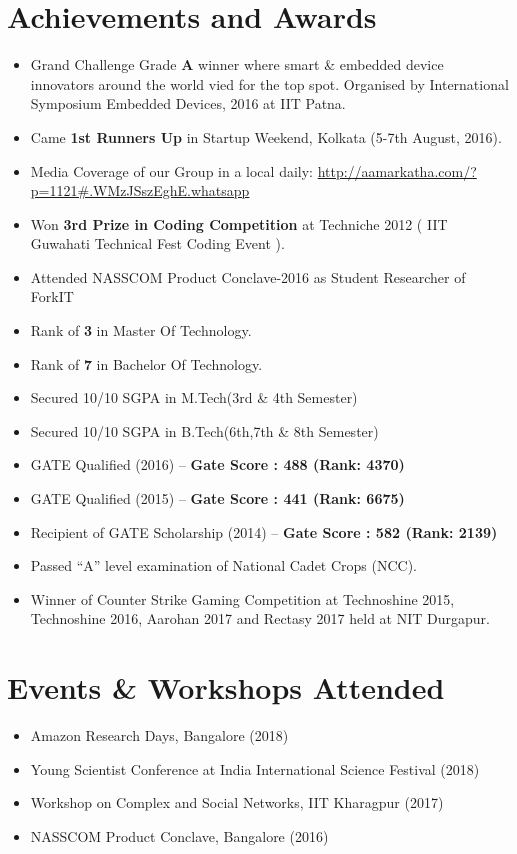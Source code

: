 \documentclass[margin, centered]{res}
\begin{document}
\begin{resume}
\section{Achievements and Awards}
\begin{itemize}[leftmargin=*]
 \item Grand Challenge Grade \textbf{A} winner where smart \& embedded device innovators around the world vied for the top spot. Organised by International Symposium Embedded Devices, 2016 at IIT Patna.
 \item Came \textbf{1st Runners Up} in Startup Weekend, Kolkata (5-7th August, 2016).
 \item Media Coverage of our Group in a local daily: \url{http://aamarkatha.com/?p=1121#.WMzJSszEghE.whatsapp}
 \item Won \textbf{3rd Prize in Coding Competition} at Techniche 2012 ( IIT Guwahati Technical Fest Coding Event ).
 \item Attended NASSCOM Product Conclave-2016 as Student Researcher of ForkIT
 \item Rank of \textbf{3} in Master Of Technology.
 \item Rank of \textbf{7} in Bachelor Of Technology.
 \item Secured 10/10 SGPA in M.Tech(3rd \& 4th Semester)
 \item Secured 10/10 SGPA in B.Tech(6th,7th \& 8th Semester)
 \item GATE Qualified (2016) – \textbf{Gate Score : 488 (Rank: 4370) }
 \item GATE Qualified (2015) – \textbf{Gate Score : 441 (Rank: 6675) }
 \item Recipient of GATE Scholarship (2014) – \textbf{Gate Score : 582 (Rank: 2139) }

 \item Passed “A” level examination of National Cadet Crops (NCC).
 \item Winner of Counter Strike Gaming Competition at Technoshine 2015, Technoshine 2016, Aarohan 2017 and Rectasy 2017 held at NIT Durgapur.
\end{itemize}


\section{Events \& Workshops Attended}
\begin{itemize}[leftmargin=*]
\item Amazon Research Days, Bangalore (2018)
\item Young Scientist Conference at India International Science Festival (2018)
\item Workshop on Complex and Social Networks, IIT Kharagpur (2017)
\item NASSCOM Product Conclave, Bangalore (2016)
\end{itemize}


\end{resume}
\end{document}
